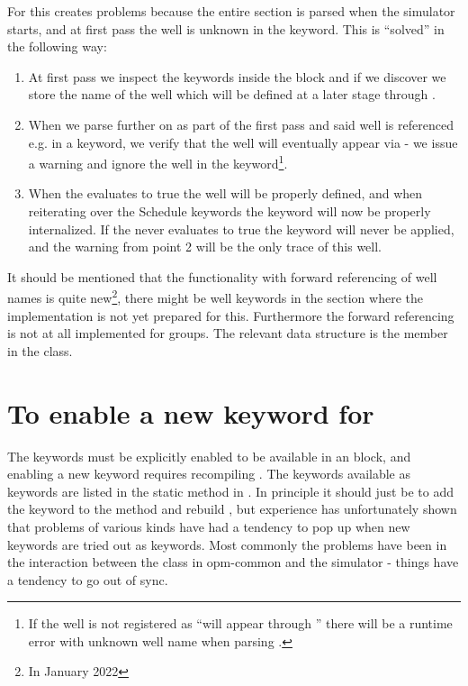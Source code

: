 For \flow{} this creates problems because the entire  section is
parsed when the simulator starts, and at first pass the well  is unknown
in the  keyword. This is ``solved'' in the following way:
\begin{enumerate}
\item At first pass we inspect the keywords inside the \actionx{} block and if
  we discover  we store the name of the well which will be defined
  at a later stage through \actionx{}.
\item When we parse further on as part of the first pass and said well is
  referenced e.g. in a  keyword, we verify that the well will
  eventually appear via \actionx{} - we issue a warning and ignore the well in
  the  keyword\footnote{If the well is not registered as ``will
  appear through \actionx{}'' there will be a runtime error with unknown well
  name when parsing .}.
\item When the \actionx{} evaluates to true the well will be properly defined,
  and when reiterating over the Schedule keywords the  keyword will
  now be properly internalized. If the \actionx{} never evaluates to true the
   keyword will never be applied, and the warning from point 2 will
  be the only trace of this well.
\end{enumerate}
It should be mentioned that the functionality with forward referencing of well
names is quite new\footnote{In January 2022}, there might be well keywords in
the  section where the implementation is not yet prepared for this.
Furthermore the forward referencing is not at all implemented for groups. The
relevant data structure is the member  in the  class.


\section{To enable a new keyword for \actionx}
The keywords must be explicitly enabled to be available in an \actionx{} block,
and enabling a new keyword requires recompiling \flow{}. The keywords available
as \actionx{} keywords are listed in the static method
 in
. In principle it should
just be to add the keyword to the  method
and rebuild \flow{}, but experience has unfortunately shown that problems of
various kinds have had a tendency to pop up when new keywords are tried out as
\actionx{} keywords. Most commonly the problems have been in the interaction
between the  class in opm-common and the simulator - things
have a tendency to go out of sync.


